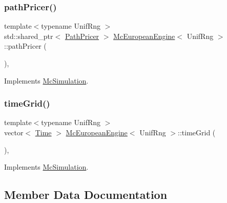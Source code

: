 \hypertarget{class_mc_european_engine_a21dd3ee9970dd5bae2be03a723d0a290}{}\label{class_mc_european_engine_a21dd3ee9970dd5bae2be03a723d0a290} 
\subsubsection{\texorpdfstring{path\+Pricer()}{pathPricer()}}
{\footnotesize\ttfamily template$<$typename Unif\+Rng $>$ \\
std\+::shared\+\_\+ptr$<$ \hyperlink{class_path_pricer}{Path\+Pricer} $>$ \hyperlink{class_mc_european_engine}{Mc\+European\+Engine}$<$ Unif\+Rng $>$\+::path\+Pricer (\begin{DoxyParamCaption}{ }\end{DoxyParamCaption})\hspace{0.3cm}{\ttfamily [override]}, {\ttfamily [virtual]}}



Implements \hyperlink{class_mc_simulation_a3182a27c79d31cfb65e9a1a6b60f5391}{Mc\+Simulation}.

\hypertarget{class_mc_european_engine_a76252919552e4061795e30f30947a1ee}{}\label{class_mc_european_engine_a76252919552e4061795e30f30947a1ee} 
\subsubsection{\texorpdfstring{time\+Grid()}{timeGrid()}}
{\footnotesize\ttfamily template$<$typename Unif\+Rng $>$ \\
vector$<$ \hyperlink{_name_def_8h_ac2d3e0ba793497bcca555c7c2cf64ff3}{Time} $>$ \hyperlink{class_mc_european_engine}{Mc\+European\+Engine}$<$ Unif\+Rng $>$\+::time\+Grid (\begin{DoxyParamCaption}{ }\end{DoxyParamCaption})\hspace{0.3cm}{\ttfamily [override]}, {\ttfamily [virtual]}}



Implements \hyperlink{class_mc_simulation_a71f4b6eedd90f057203a94467a691387}{Mc\+Simulation}.



\subsection{Member Data Documentation}
\hypertarget{class_mc_european_engine_ae6c942f2c6f52c461663968f8b5f9161}{}\label{class_mc_european_engine_ae6c942f2c6f52c461663968f8b5f9161} 
